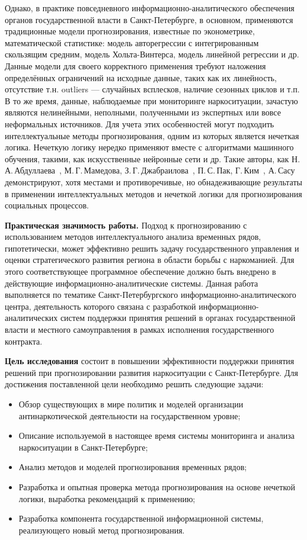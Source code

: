 Однако, в практике повседневного информационно-аналитического обеспечения
органов государственной власти в Санкт-Петербурге, в основном, применяются
традиционные модели прогнозирования, известные по эконометрике, математической
статистике: модель авторегрессии с интегрированным скользящим средним, модель
Хольта-Винтерса, модель линейной регрессии и др. Данные модели для своего
корректного применения требуют наложения определённых ограничений на исходные
данные, таких как их линейность, отсутствие т.н. outliers --- случайных
всплесков, наличие сезонных циклов и т.п. В то же время, данные, наблюдаемые при
мониторинге наркоситуации, зачастую являются нелинейными, неполными,
полученными из экспертных или вовсе неформальных источников. Для учета этих
особенностей могут подходить интеллектуальные методы прогнозирования, одним из
которых является нечеткая логика. Нечеткую логику нередко применяют вместе с
алгоритмами машинного обучения, такими, как искусственные нейронные сети и др.
Такие авторы, как Н.\,А.\,Абдуллаева~\cite{Abdullaeva2010}, М.\,Г.\,Мамедова,
З.\,Г.\,Джабраилова~\cite{Mamedova2005}, П.\,С.\,Пак, Г.\,Ким~\cite{Pak2005},
А.\,Сасу~\cite{Sasu2010} демонстрируют, хотя местами и противоречивые, но
обнадеживающие результаты в применении интеллектуальных методов и нечеткой
логики для прогнозирования социальных процессов. 

\textbf{Практическая значимость работы.} Подход к прогнозированию с
использованием методов интеллектуального анализа временных рядов, гипотетически,
может эффективно решить задачу государственного управления и оценки
стратегического развития региона в области борьбы с наркоманией. Для этого
соответствующее программное обеспечение должно быть внедрено в действующие
информационно-аналитические системы. Данная работа выполняется по тематике
Санкт-Петербургского информационно-аналитического центра, деятельность которого
связана с разработкой информационно-аналитических систем поддержки принятия
решений в органах государственной власти и местного самоуправления в рамках
исполнения государственного контракта.

\textbf{Цель исследования} состоит в повышении эффективности поддержки принятия
решений при прогнозировании развития наркоситуации с Санкт-Петербурге. Для
достижения поставленной цели необходимо решить следующие задачи:
\begin{itemize}
\item Обзор существующих в мире политик и моделей организации антинаркотической
деятельности на государственном уровне;
\item Описание используемой в настоящее время системы мониторинга и анализа
наркоситуации в Санкт-Петербурге;
\item Анализ методов и моделей прогнозирования временных рядов;
\item Разработка и опытная проверка метода прогнозирования на основе нечеткой
логики, выработка рекомендаций к применению;
\item Разработка компонента государственной информационной системы, реализующего
новый метод прогнозирования.
\end{itemize}




